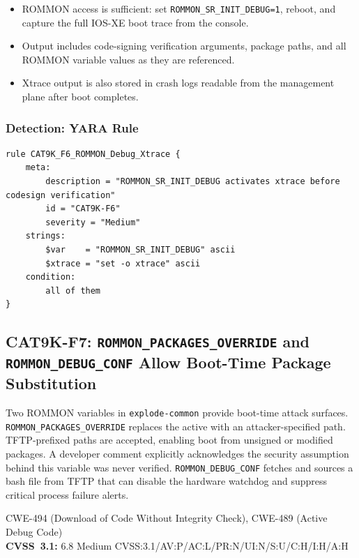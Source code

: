 \documentclass[11pt,a4paper]{article}
\begin{document}
\begin{itemize}[nosep]
  \item ROMMON access is sufficient: set \texttt{ROMMON\_SR\_INIT\_DEBUG=1}, reboot,
    and capture the full IOS-XE boot trace from the console.
  \item Output includes code-signing verification arguments, package paths, and all
    ROMMON variable values as they are referenced.
  \item Xtrace output is also stored in crash logs readable from the management plane
    after boot completes.
\end{itemize}

\subsubsection{Detection: YARA Rule}

\begin{lstlisting}[style=yara]
rule CAT9K_F6_ROMMON_Debug_Xtrace {
    meta:
        description = "ROMMON_SR_INIT_DEBUG activates xtrace before codesign verification"
        id = "CAT9K-F6"
        severity = "Medium"
    strings:
        $var    = "ROMMON_SR_INIT_DEBUG" ascii
        $xtrace = "set -o xtrace" ascii
    condition:
        all of them
}
\end{lstlisting}

\subsection{CAT9K-F7: \texorpdfstring{\texttt{ROMMON\_PACKAGES\_OVERRIDE}}{ROMMON\_PACKAGES\_OVERRIDE} and \texorpdfstring{\texttt{ROMMON\_DEBUG\_CONF}}{ROMMON\_DEBUG\_CONF} Allow Boot-Time Package Substitution}

\begin{overviewbox}
Two ROMMON variables in \texttt{explode-common} provide boot-time attack surfaces.
\texttt{ROMMON\_PACKAGES\_OVERRIDE} replaces the active  with an
attacker-specified path. TFTP-prefixed paths are accepted, enabling boot from unsigned
or modified packages. A developer comment explicitly acknowledges the security assumption
behind this variable was never verified.
\texttt{ROMMON\_DEBUG\_CONF} fetches and sources a bash file from TFTP that can
disable the hardware watchdog and suppress critical process failure alerts.

CWE-494 (Download of Code Without Integrity Check), CWE-489 (Active Debug Code)\\
\textbf{CVSS~3.1:} 6.8 Medium \quad CVSS:3.1/AV:P/AC:L/PR:N/UI:N/S:U/C:H/I:H/A:H
\end{overviewbox}
\end{document}
